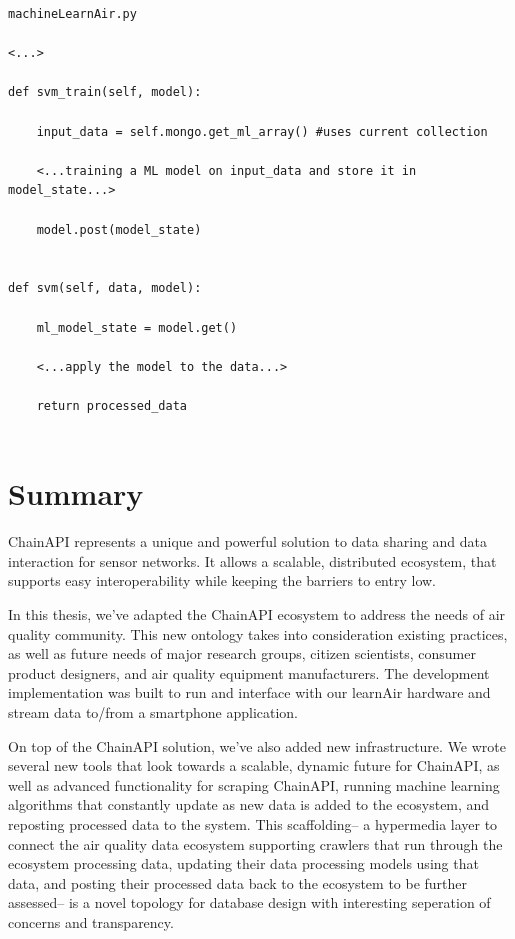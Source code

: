 \begin{lstlisting}[style=code]
machineLearnAir.py

<...>

def svm_train(self, model):

	input_data = self.mongo.get_ml_array() #uses current collection

	<...training a ML model on input_data and store it in model_state...>

	model.post(model_state)


def svm(self, data, model):

	ml_model_state = model.get()

	<...apply the model to the data...>

	return processed_data


\end{lstlisting}


\section{Summary}

ChainAPI represents a unique and powerful solution to data sharing and data interaction for sensor networks.  It allows a scalable, distributed ecosystem, that supports easy interoperability while keeping the barriers to entry low.  

In this thesis, we've adapted the ChainAPI ecosystem to address the needs of air quality community.  This new ontology takes into consideration existing practices, as well as future needs of major research groups, citizen scientists, consumer product designers, and air quality equipment manufacturers.  The development implementation was built to run and interface with our learnAir hardware and stream data to/from a smartphone application.

On top of the ChainAPI solution, we've also added new infrastructure.  We wrote several new tools that look towards a scalable, dynamic future for ChainAPI, as well as advanced functionality for scraping ChainAPI, running machine learning algorithms that constantly update as new data is added to the ecosystem, and reposting processed data to the system.  This scaffolding-- a hypermedia layer to connect the air quality data ecosystem supporting crawlers that run through the ecosystem processing data, updating their data processing models using that data, and posting their processed data back to the ecosystem to be further assessed-- is a novel topology for database design with interesting seperation of concerns and transparency.

